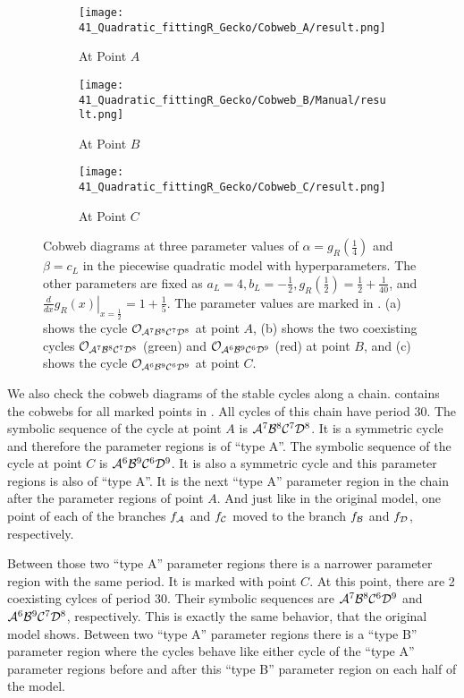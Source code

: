 \begin{figure}
	\centering
	\begin{subfigure}{0.3\textwidth}
		\centering
		\texttt{[image: 41\_Quadratic\_fittingR\_Gecko/Cobweb\_A/result.png]}
		\caption{At Point $A$}
		\label{fig:setup.quad.hyper.2.cobweb.A}
	\end{subfigure}
	\begin{subfigure}{0.3\textwidth}
		\centering
		\texttt{[image: 41\_Quadratic\_fittingR\_Gecko/Cobweb\_B/Manual/result.png]}
		\caption{At Point $B$}
		\label{fig:setup.quad.hyper.2.cobweb.B}
	\end{subfigure}
	\begin{subfigure}{0.3\textwidth}
		\centering
		\texttt{[image: 41\_Quadratic\_fittingR\_Gecko/Cobweb\_C/result.png]}
		\caption{At Point $C$}
		\label{fig:setup.quad.hyper.2.cobweb.C}
	\end{subfigure}
	\caption[Cobwebs of the piecewise quadratic model with hyperparameters for different values of the fixed parameters]{
	Cobweb diagrams at three parameter values of $\alpha = g_R\left(\frac{1}{4}\right)$ and $\beta = c_L$ in the piecewise quadratic model with hyperparameters.
	The other parameters are fixed as $a_L = 4, b_L = -\frac{1}{2}, g_R\left(\frac{1}{2}\right) = \frac{1}{2} + \frac{1}{40}$, and $\left. \frac{d}{dx} g_R(x) \right|_{x = \frac{1}{2}} = 1 + \frac{1}{5}$.
	The parameter values are marked in .
	(a) shows the cycle $\mathcal{O}_{\mathcal{A}^7\mathcal{B}^8\mathcal{C}^7\mathcal{D}^8}$ at point $A$, (b) shows the two coexisting cycles $\mathcal{O}_{\mathcal{A}^7\mathcal{B}^8\mathcal{C}^7\mathcal{D}^8}$ (green) and $\mathcal{O}_{\mathcal{A}^6\mathcal{B}^9\mathcal{C}^6\mathcal{D}^9}$ (red) at point $B$, and (c) shows the cycle $\mathcal{O}_{\mathcal{A}^6\mathcal{B}^9\mathcal{C}^6\mathcal{D}^9}$ at point $C$.
	}
	\label{fig:setup.quad.hyper.2.cobwebs}
\end{figure}

We also check the cobweb diagrams of the stable cycles along a chain.
 contains the cobwebs for all marked points in .
All cycles of this chain have period $30$.
The symbolic sequence of the cycle at point $A$ is $\mathcal{A}^7\mathcal{B}^8\mathcal{C}^7\mathcal{D}^8$.
It is a symmetric cycle and therefore the parameter regions is of ``type A''.
The symbolic sequence of the cycle at point $C$ is $\mathcal{A}^6\mathcal{B}^9\mathcal{C}^6\mathcal{D}^9$.
It is also a symmetric cycle and this parameter regions is also of ``type A''.
It is the next ``type A'' parameter region in the chain after the parameter regions of point $A$.
And just like in the original model, one point of each of the branches $f_{\mathcal{A}}$ and $f_{\mathcal{C}}$ moved to the branch $f_{\mathcal{B}}$ and $f_{\mathcal{D}}$, respectively.

Between those two ``type A'' parameter regions there is a narrower parameter region with the same period.
It is marked with point $C$.
At this point, there are 2 coexisting cylces of period 30.
Their symbolic sequences are $\mathcal{A}^7\mathcal{B}^8\mathcal{C}^6\mathcal{D}^9$ and $\mathcal{A}^6\mathcal{B}^9\mathcal{C}^7\mathcal{D}^8$, respectively.
This is exactly the same behavior, that the original model shows.
Between two ``type A'' parameter regions there is a ``type B'' parameter region where the cycles behave like either cycle of the ``type A'' parameter regions before and after this ``type B'' parameter region on each half of the model.
